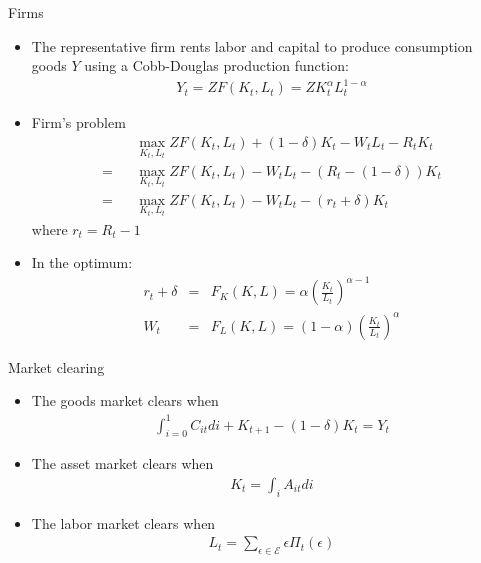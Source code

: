 \documentclass[9pt]{beamer}
\newcommand{\bit}{\begin{itemize}}
\newcommand{\eit}{\end{itemize}}
\begin{document}
\begin{frame}{Firms}

\bit
\setlength\itemsep{1.5em}

\item The representative firm rents labor and capital to produce consumption goods $Y$ using a Cobb-Douglas production function:
\begin{eqnarray}
Y_t = ZF(K_t, L_t) = ZK_t^{\alpha}L_t^{1-\alpha} \nonumber
\end{eqnarray}

\item Firm's problem
\begin{eqnarray}
&& \max_{K_t, L_t} ZF(K_t, L_t)+(1-\delta)K_t - W_t L_t - R_t K_t \nonumber \\
=&& \max_{K_t, L_t} ZF(K_t, L_t) - W_t L_t - (R_t - (1-\delta)) K_t \nonumber \\
=&& \max_{K_t, L_t} ZF(K_t, L_t) - W_t L_t - (r_t + \delta) K_t \nonumber
\end{eqnarray}
where $r_t = R_t-1$

\item In the optimum:
\begin{eqnarray}
r_t +\delta &=&  F_K(K, L) = \alpha \left(\frac{K_t}{L_t}\right)^{\alpha-1} \nonumber \\
W_t &=& F_L(K, L) = (1-\alpha) \left(\frac{K_t}{L_t}\right)^{\alpha} \nonumber
\end{eqnarray}

\eit

\end{frame}

\begin{frame}{Market clearing}

\bit
\setlength\itemsep{2em}

\item The goods market clears when
\begin{eqnarray}
\int_{i=0}^{1}C_{it} di + K_{t+1}-(1-\delta)K_t = Y_t \nonumber
\end{eqnarray}

\item The asset market clears when
\begin{eqnarray}
K_t = \int_{i} A_{it} di \nonumber
\end{eqnarray}

\item The labor market clears when
\begin{eqnarray}
L_t = \sum_{\epsilon \in \mathcal E} \epsilon \Pi_t(\epsilon) \nonumber
\end{eqnarray}


\eit

\end{frame}
\end{document}
